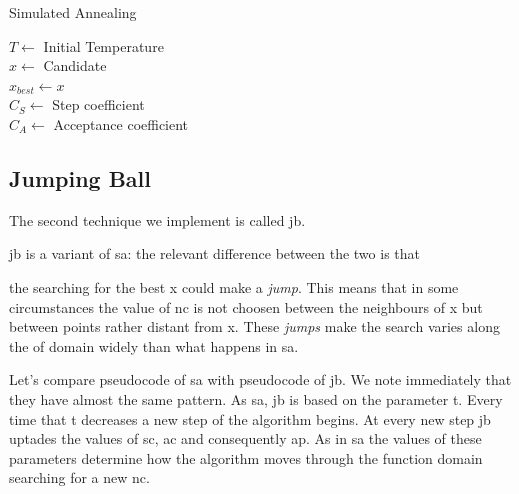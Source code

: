 \documentclass[journal]{IEEEtran}
\begin{document}
\begin{algorithm}
\caption{Simulated Annealing} \label{code_sa}
$T \gets$ Initial Temperature \\
$x \gets$ Candidate \\
$x_{best} \gets x$ \\
$C_S \gets$ Step coefficient \\
$C_A \gets$ Acceptance coefficient \\

\end{algorithm}

\subsection{Jumping Ball}

The second technique we implement is called \gls{jb}.

\gls{jb} is a variant of \gls{sa}: the relevant difference between the two is that


the searching for the best \gls{x} could make a \textit{jump}. This means that in some circumstances the value of \gls{nc} is not choosen between the neighbours of \gls{x} but between points rather distant from \gls{x}. These \textit{jumps} make the search  varies along the \gls{of} domain widely than what happens in \gls{sa}.

Let's compare pseudocode of \gls{sa} with pseudocode of \gls{jb}. We note immediately that they have almost the same pattern. As \gls{sa}, \gls{jb} is based on the parameter \gls{t}. Every time that \gls{t} decreases a new step of the algorithm begins. At every new step \gls{jb} uptades the values of \gls{sc}, \gls{ac} and consequently \gls{ap}. As in \gls{sa} the values of these parameters determine how the algorithm moves through the function domain searching for a new \gls{nc}.
\end{document}
